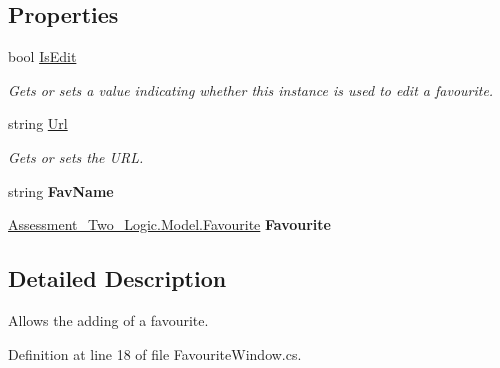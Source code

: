 \subsection*{Properties}
\begin{DoxyCompactItemize}
\item 
bool \hyperlink{class_assessment___two_1_1_favourite_window_a83eda3136770a534d9d3bc6cef5ba7e9}{IsEdit}
\begin{DoxyCompactList}\small\item\em Gets or sets a value indicating whether this instance is used to edit a favourite. \item\end{DoxyCompactList}\item 
string \hyperlink{class_assessment___two_1_1_favourite_window_a5989bc66c2e8ec5414935a1ce3ba47d8}{Url}
\begin{DoxyCompactList}\small\item\em Gets or sets the URL. \item\end{DoxyCompactList}\item 
\hypertarget{class_assessment___two_1_1_favourite_window_aa49fb3e3bf74302a8273d34f72632e30}{
string {\bfseries FavName}}
\label{class_assessment___two_1_1_favourite_window_aa49fb3e3bf74302a8273d34f72632e30}

\item 
\hypertarget{class_assessment___two_1_1_favourite_window_a4ef4a37a08970d98ec639acc90b14f3f}{
\hyperlink{class_assessment___two___logic_1_1_model_1_1_favourite}{Assessment\_\-Two\_\-Logic.Model.Favourite} {\bfseries Favourite}}
\label{class_assessment___two_1_1_favourite_window_a4ef4a37a08970d98ec639acc90b14f3f}

\end{DoxyCompactItemize}


\subsection{Detailed Description}
Allows the adding of a favourite. 

Definition at line 18 of file FavouriteWindow.cs.



